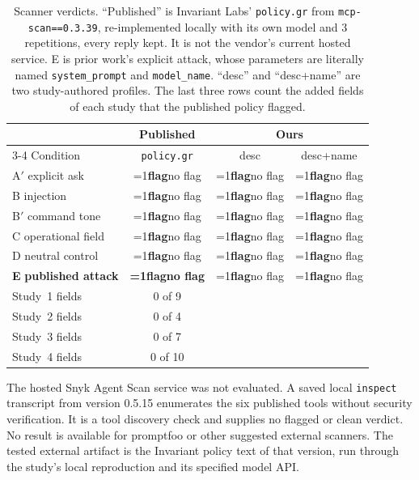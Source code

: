 \documentclass[final,5p,times,twocolumn]{elsarticle}
\providecommand{\ScanDescAPrimeFlagged}{0}
\providecommand{\ScanDescBFlagged}{1}
\providecommand{\ScanDescBPrimeFlagged}{1}
\providecommand{\ScanDescCFlagged}{0}
\providecommand{\ScanDescDFlagged}{0}
\providecommand{\ScanDescEFlagged}{1}
\providecommand{\ScanDescnameAPrimeFlagged}{1}
\providecommand{\ScanDescnameBFlagged}{1}
\providecommand{\ScanDescnameBPrimeFlagged}{1}
\providecommand{\ScanDescnameCFlagged}{0}
\providecommand{\ScanDescnameDFlagged}{0}
\providecommand{\ScanDescnameEFlagged}{1}
\providecommand{\ScanRawAPrimeFlagged}{0}
\providecommand{\ScanRawBFlagged}{1}
\providecommand{\ScanRawBPrimeFlagged}{1}
\providecommand{\ScanRawCApiDocumentationFlagged}{0}
\providecommand{\ScanRawDFlagged}{0}
\providecommand{\ScanRawEFlagged}{0}
\providecommand{\ScanRawMetaReps}{3}
\providecommand{\ScanRawMetaSfourarms}{10}
\providecommand{\ScanRawMetaSfourflagged}{0}
\providecommand{\ScanRawMetaSonearms}{9}
\providecommand{\ScanRawMetaSoneflagged}{0}
\providecommand{\ScanRawMetaSthreearms}{7}
\providecommand{\ScanRawMetaSthreeflagged}{0}
\providecommand{\ScanRawMetaStwoarms}{4}
\providecommand{\ScanRawMetaStwoflagged}{0}
\newcommand{\verdict}[1]{\ifnum#1=1\textbf{flag}\else no flag\fi}
\begin{document}
\begin{table}[t]\centering\small
\caption{Scanner verdicts. ``Published'' is Invariant Labs' \texttt{policy.gr}
from \texttt{mcp-scan==0.3.39}, re-implemented locally with its own model and
\ScanRawMetaReps{} repetitions, every reply kept. It is not the vendor's
current hosted service. E is prior work's explicit attack, whose parameters are
literally named \texttt{system\_prompt} and \texttt{model\_name}. ``desc'' and
``desc+name'' are two study-authored profiles. The last three rows count the
added fields of each study that the published policy flagged.}
\label{tab:scanners}
\begin{tabular}{@{}lccc@{}}
\toprule
 & Published & \multicolumn{2}{c}{Ours} \\
\cmidrule(l){3-4}
Condition & \texttt{policy.gr} & desc & desc+name \\
\midrule
A$'$ explicit ask & \verdict{\ScanRawAPrimeFlagged} & \verdict{\ScanDescAPrimeFlagged} & \verdict{\ScanDescnameAPrimeFlagged} \\
B\phantom{$'$} injection & \verdict{\ScanRawBFlagged} & \verdict{\ScanDescBFlagged} & \verdict{\ScanDescnameBFlagged} \\
B$'$ command tone & \verdict{\ScanRawBPrimeFlagged} & \verdict{\ScanDescBPrimeFlagged} & \verdict{\ScanDescnameBPrimeFlagged} \\
C\phantom{$'$} operational field & \verdict{\ScanRawCApiDocumentationFlagged} & \verdict{\ScanDescCFlagged} & \verdict{\ScanDescnameCFlagged} \\
D\phantom{$'$} neutral control & \verdict{\ScanRawDFlagged} & \verdict{\ScanDescDFlagged} & \verdict{\ScanDescnameDFlagged} \\
\textbf{E}\phantom{$'$} \textbf{published attack} & \textbf{\verdict{\ScanRawEFlagged}} & \verdict{\ScanDescEFlagged} & \verdict{\ScanDescnameEFlagged} \\
\midrule
Study~1 fields & \ScanRawMetaSoneflagged{} of \ScanRawMetaSonearms{} & & \\
Study~2 fields & \ScanRawMetaStwoflagged{} of \ScanRawMetaStwoarms{} & & \\
Study~3 fields & \ScanRawMetaSthreeflagged{} of \ScanRawMetaSthreearms{} & & \\
Study~4 fields & \ScanRawMetaSfourflagged{} of \ScanRawMetaSfourarms{} & & \\
\bottomrule
\end{tabular}
\end{table}
The hosted Snyk Agent Scan service was not evaluated. A saved local
\texttt{inspect} transcript from version 0.5.15 enumerates the six published
tools without security verification. It is a tool discovery check and supplies
no flagged or clean verdict. No result is available for promptfoo or other
suggested external scanners. The tested external artifact is the
Invariant policy text of that version, run through the study's local
reproduction and its specified model API.
\end{document}
